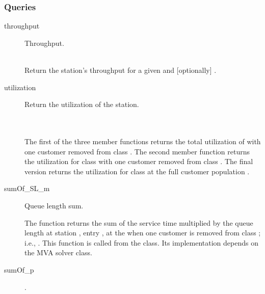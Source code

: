 \subsubsection{Queries}

\begin{description}
\item[throughput] \texonly{---} Throughput.\\
  \\

  Return the station's throughput for a given  and
  [optionally] .

\item[utilization] \texonly{---} Return the utilization of the station.\\
   \\
   \\

  The first of the three member functions returns the total
  utilization of  with one customer removed from class
  .  The second member function returns the utilization for
  class  with one customer removed from class .  The
  final version returns the utilization for class  at the full
  customer population .

\item[sumOf_SL_m] \texonly{---} Queue length sum.\\

  The function  returns the sum of the service time
  multiplied by the queue length at station , entry , at
  the   when one customer is
  removed from class ; i.e., .  This function is called from the
   class.  Its implementation depends on the
  MVA solver class.

\item[sumOf_p] \texonly{---} .\\


\end{description}
